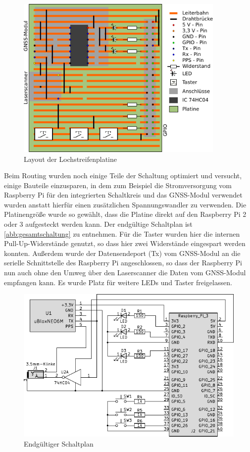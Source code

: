 \documentclass[a4paper,12pt,bibliography=totoc, listof=totoc,titlepage,pointlessnumbers]{scrreprt}
\begin{document}
\begin{figure}
 \centering
 \includegraphics[width=0.9\textwidth]{img/platine.pdf}
 \caption{Layout der Lochstreifenplatine}
 \label{abb:platine}
\end{figure}

Beim Routing wurden noch einige Teile der Schaltung optimiert und versucht, einige Bauteile einzusparen, in dem zum Beispiel die Stromversorgung vom Raspberry Pi für den integrierten Schaltkreis und das GNSS-Modul verwendet wurden anstatt hierfür einen zusätzlichen Spannungswandler zu verwenden. Die Platinengröße wurde so gewählt, dass die Platine direkt auf den Raspberry Pi 2 oder 3 aufgesteckt werden kann. Der endgültige Schaltplan ist \autoref{abb:gesamtschaltung} zu entnehmen. Für die Taster wurden hier die internen Pull-Up-Widerstände genutzt, so dass hier zwei Widerstände eingespart werden konnten. Außerdem wurde der Datensendeport (Tx) vom GNSS-Modul an die serielle Schnittstelle des Raspberry Pi angeschlossen, so dass der Raspberry Pi nun auch ohne den Umweg über den Laser\-scan\-ner die Daten vom GNSS-Modul empfangen kann. Es wurde Platz für weitere LEDs und Taster freigelassen.

\begin{figure}
 \centering
 \includegraphics[width=1\textwidth]{img/schaltplanGesamt.pdf}
 \caption{Endgültiger Schaltplan}
 \label{abb:gesamtschaltung}
\end{figure}
\end{document}
